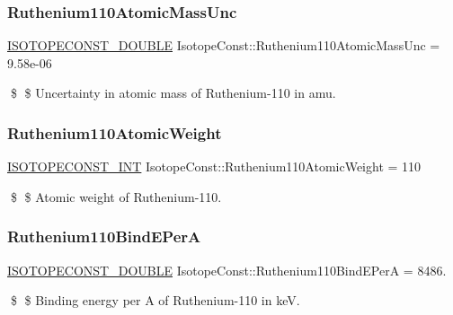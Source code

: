 \subsubsection{\texorpdfstring{Ruthenium110\+Atomic\+Mass\+Unc}{Ruthenium110AtomicMassUnc}}
{\footnotesize\ttfamily \mbox{\hyperlink{group___isotope_const-_macros_ga8f45a7272ce02c0b4c65c44636ed719a}{I\+S\+O\+T\+O\+P\+E\+C\+O\+N\+S\+T\+\_\+\+D\+O\+U\+B\+LE}} Isotope\+Const\+::\+Ruthenium110\+Atomic\+Mass\+Unc = 9.\+58e-\/06}

\$ \$ Uncertainty in atomic mass of Ruthenium-\/110 in amu. \mbox{\label{group___isotope_const-_ruthenium-_ru110_ga09f14150ec6d4fa9a827fa4f175c89c2}} 
\subsubsection{\texorpdfstring{Ruthenium110\+Atomic\+Weight}{Ruthenium110AtomicWeight}}
{\footnotesize\ttfamily \mbox{\hyperlink{group___isotope_const-_macros_ga5f18360b3e99483a35c32d789e62621c}{I\+S\+O\+T\+O\+P\+E\+C\+O\+N\+S\+T\+\_\+\+I\+NT}} Isotope\+Const\+::\+Ruthenium110\+Atomic\+Weight = 110}

\$ \$ Atomic weight of Ruthenium-\/110. \mbox{\label{group___isotope_const-_ruthenium-_ru110_ga33c45939ccda4e21314089b8092fcba3}} 
\subsubsection{\texorpdfstring{Ruthenium110\+Bind\+E\+PerA}{Ruthenium110BindEPerA}}
{\footnotesize\ttfamily \mbox{\hyperlink{group___isotope_const-_macros_ga8f45a7272ce02c0b4c65c44636ed719a}{I\+S\+O\+T\+O\+P\+E\+C\+O\+N\+S\+T\+\_\+\+D\+O\+U\+B\+LE}} Isotope\+Const\+::\+Ruthenium110\+Bind\+E\+PerA = 8486.}

\$ \$ Binding energy per A of Ruthenium-\/110 in keV. \mbox{\label{group___isotope_const-_ruthenium-_ru110_ga01c92e69b80b1b00a2ea5f8254d729b2}} 
